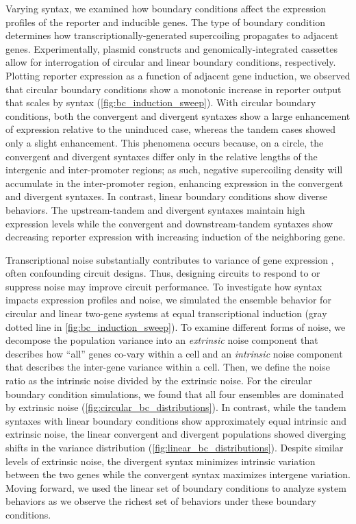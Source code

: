 \documentclass[11pt]{article}
\begin{document}
Varying syntax, we examined how boundary conditions affect the expression profiles of the reporter and inducible genes. The type of boundary condition determines how transcriptionally-generated supercoiling propagates to adjacent genes. Experimentally, plasmid constructs and genomically-integrated cassettes allow for interrogation of circular and linear boundary conditions, respectively.  Plotting reporter expression as a function of adjacent gene induction, we observed that circular boundary conditions show a monotonic increase in reporter output that scales by syntax (\cref{fig:bc_induction_sweep}). With circular boundary conditions, both the convergent and divergent syntaxes show a large enhancement of expression relative to the uninduced case, whereas the tandem cases showed only a slight enhancement. This phenomena occurs because, on a circle, the convergent and divergent syntaxes differ only in the relative lengths of the intergenic and inter-promoter regions; as such, negative supercoiling density will accumulate in the inter-promoter region, enhancing expression in the convergent and divergent syntaxes. In contrast, linear boundary conditions show diverse behaviors. The upstream-tandem and divergent syntaxes maintain high expression levels while the convergent and downstream-tandem syntaxes show decreasing reporter expression with increasing induction of the neighboring gene.

Transcriptional noise substantially contributes to variance of gene expression \parencite{quartonUncouplingGeneExpression2020}, often confounding circuit designs. Thus, designing circuits to respond to or suppress noise may improve circuit performance. To investigate how syntax impacts expression profiles and noise, we simulated the ensemble behavior for circular and linear two-gene systems at equal transcriptional induction (gray dotted line in \cref{fig:bc_induction_sweep}). To examine different forms of noise, we decompose the population variance into an \emph{extrinsic} noise component that describes how ``all'' genes co-vary within a cell and an \emph{intrinsic} noise component that describes the inter-gene variance within a cell. Then, we define the noise ratio as the intrinsic noise divided by the extrinsic noise. For the circular boundary condition simulations, we found that all four ensembles are dominated by extrinsic noise (\cref{fig:circular_bc_distributions}). In contrast, while the tandem syntaxes with linear boundary conditions show approximately equal intrinsic and extrinsic noise, the linear convergent and divergent populations showed diverging shifts in the variance distribution (\cref{fig:linear_bc_distributions}). Despite similar levels of extrinsic noise, the divergent syntax minimizes intrinsic variation between the two genes while the convergent syntax maximizes intergene variation. 
Moving forward, we used the linear set of boundary conditions to analyze system behaviors as we observe the richest set of behaviors under these boundary conditions.
\end{document}
